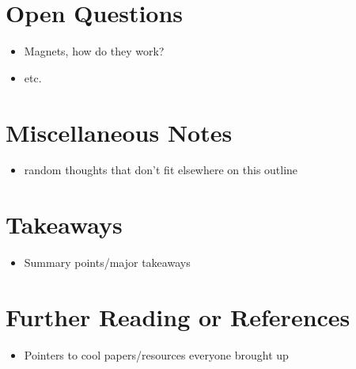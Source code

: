 \documentclass{article}
\begin{document}
\section{Open Questions}
\begin{itemize}
    \item Magnets, how do they work?
    \item etc.
\end{itemize}{}

\section{Miscellaneous Notes}
\begin{itemize}
    \item random thoughts that don't fit elsewhere on this outline
\end{itemize}{}

\section{Takeaways}
\begin{itemize}
    \item Summary points/major takeaways
\end{itemize}{}

\section{Further Reading or References}
\begin{itemize}
    \item Pointers to cool papers/resources everyone brought up
\end{itemize}
\end{document}
